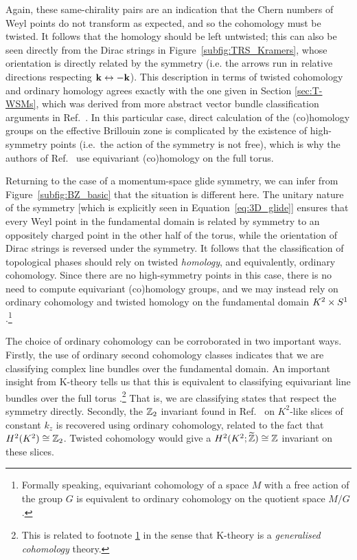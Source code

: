Again, these same-chirality pairs are an indication that the Chern numbers of Weyl points do not transform as expected, and so the cohomology must be twisted. It follows that the homology should be left untwisted; this can also be seen directly from the Dirac strings in Figure~\ref{subfig:TRS_Kramers}, whose orientation is directly related by the symmetry (i.e. the arrows run in relative directions respecting $\vb{k}\leftrightarrow-\vb{k}$). This description in terms of twisted cohomology and ordinary homology agrees exactly with the one given in Section \ref{sec:T-WSMs}, which was derived from more abstract vector bundle classification arguments in Ref.~\cite{Thiang_equivariant}. In this particular case, direct calculation of the (co)homology groups on the effective Brillouin zone is complicated by the existence of high-symmetry points (i.e.\ the action of the symmetry is not free), which is why the authors of Ref.~\cite{Thiang_equivariant} use equivariant (co)homology on the full torus.

Returning to the case of a momentum-space glide symmetry, we can infer from Figure~\ref{subfig:BZ_basic} that the situation is different here. The unitary nature of the symmetry [which is explicitly seen in Equation~\eqref{eq:3D_glide}] ensures that every Weyl point in the fundamental domain is related by symmetry to an oppositely charged point in the other half of the torus, while the orientation of Dirac strings is reversed under the symmetry. It follows that the classification of topological phases should rely on twisted \emph{homology}, and equivalently, ordinary cohomology. Since there are no high-symmetry points in this case, there is no need to compute equivariant (co)homology groups, and we may instead rely on ordinary cohomology and twisted homology on the fundamental domain $K^2\times S^1$.\footnote{\label{ft:eq_cohom}
	Formally speaking, equivariant cohomology of a space $M$ with a free action of the group $G$ is equivalent to ordinary cohomology on the quotient space $M/G$ \parencite[Corollary 9.6]{Tu_equivariant}.}

The choice of ordinary cohomology can be corroborated in two important ways. Firstly, the use of ordinary second cohomology classes indicates that we are classifying complex line bundles over the fundamental domain. An important insight from K-theory tells us that this is equivalent to classifying equivariant line bundles over the full torus \parencite[Proposition 2.1]{Segal_K-theory}.\footnote{
	This is related to footnote \ref{ft:eq_cohom} in the sense that K-theory is a \emph{generalised cohomology} theory.}
That is, we are classifying states that respect the symmetry directly. Secondly, the $\mathbb{Z}_2$ invariant found in Ref.~\cite{Fonseca-Vaidya_nonorientable} on $K^2$-like slices of constant $k_z$ is recovered using ordinary cohomology, related to the fact that $H^2(K^2)\cong\mathbb{Z}_2$. Twisted cohomology would give a $H^2(K^2;\widetilde{\mathbb{Z}})\cong\mathbb{Z}$ invariant on these slices.

